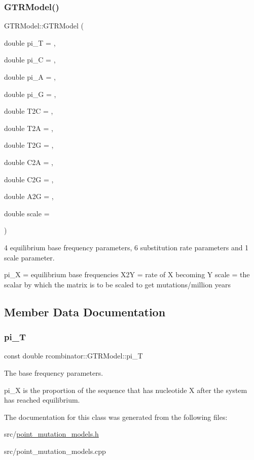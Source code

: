 \subsubsection{\texorpdfstring{G\+T\+R\+Model()}{GTRModel()}}
{\footnotesize\ttfamily G\+T\+R\+Model\+::\+G\+T\+R\+Model (\begin{DoxyParamCaption}\item[{double}]{pi\+\_\+T = {},  }\item[{double}]{pi\+\_\+C = {},  }\item[{double}]{pi\+\_\+A = {},  }\item[{double}]{pi\+\_\+G = {},  }\item[{double}]{T2C = {},  }\item[{double}]{T2A = {},  }\item[{double}]{T2G = {},  }\item[{double}]{C2A = {},  }\item[{double}]{C2G = {},  }\item[{double}]{A2G = {},  }\item[{double}]{scale = {} }\end{DoxyParamCaption})}



4 equilibrium base frequency parameters, 6 substitution rate parameters and 1 scale parameter. 

pi\+\_\+X = equilibrium base frequencies X2Y = rate of X becoming Y scale = the scalar by which the matrix is to be scaled to get mutations/million years 

\subsection{Member Data Documentation}
\mbox{\label{classrcombinator_1_1GTRModel_a1f58fe556a5ce9aaba6168c9f91e8372}} 
\subsubsection{\texorpdfstring{pi\+\_\+T}{pi\_T}}
{\footnotesize\ttfamily const double rcombinator\+::\+G\+T\+R\+Model\+::pi\+\_\+T\hspace{0.3cm}{\ttfamily [protected]}}



The base frequency parameters. 

pi\+\_\+X is the proportion of the sequence that has nucleotide X after the system has reached equilibrium. 

The documentation for this class was generated from the following files\+:\begin{DoxyCompactItemize}
\item 
src/\mbox{\hyperlink{point__mutation__models_8h}{point\+\_\+mutation\+\_\+models.\+h}}\item 
src/point\+\_\+mutation\+\_\+models.\+cpp\end{DoxyCompactItemize}
